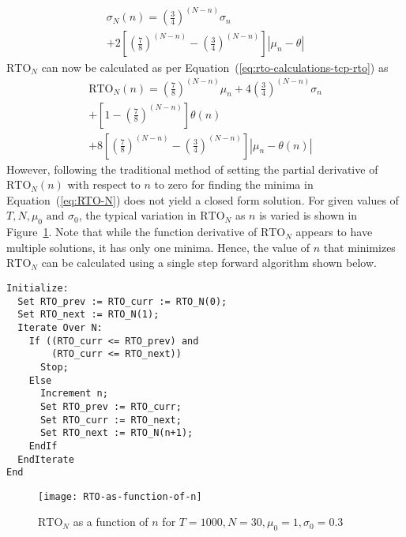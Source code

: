 \documentclass[conference]{IEEEtran}
\begin{document}
\begin{multline}
  \label{eq:sigma-N}
  \sigma_N(n) = \left(\frac{3}{4}\right)^{(N-n)} \sigma_n \\+ 2 \left[\left(\frac{7}{8}\right)^{(N-n)} - \left(\frac{3}{4}\right)^{(N-n)}\right] |\mu_n - \theta|
\end{multline}
$\text{RTO}_N$ can now be calculated as per Equation~(\ref{eq:rto-calculations-tcp-rto}) as
\begin{multline}
  \text{RTO}_N(n) = \left(\frac{7}{8}\right)^{(N-n)} \mu_n + 4\left(\frac{3}{4}\right)^{(N-n)} \sigma_n 
  \\+ \left[1-\left(\frac{7}{8}\right)^{(N-n)}\right] \theta(n)  
  \\+ 8\left[\left(\frac{7}{8}\right)^{(N-n)} - \left(\frac{3}{4}\right)^{(N-n)}\right] |\mu_n-\theta(n)|
  \label{eq:RTO-N}
\end{multline}
However, following the traditional method of setting the partial derivative of $\text{RTO}_N(n)$ with respect to $n$ to zero for finding the minima in Equation~(\ref{eq:RTO-N}) does not yield a closed form solution. For given values of $T, N, \mu_0 \text{ and } \sigma_0$, the typical variation in $\text{RTO}_N$ as $n$ is varied is shown in Figure~\ref{fig:rto-function-n}. Note that while the function derivative of $\text{RTO}_N$ appears to have multiple solutions, it has only one minima. Hence, the value of $n$ that minimizes $\text{RTO}_N$ can be calculated using a single step forward algorithm shown below. 

\begin{verbatim}
Initialize: 
  Set RTO_prev := RTO_curr := RTO_N(0);
  Set RTO_next := RTO_N(1);
  Iterate Over N:
    If ((RTO_curr <= RTO_prev) and 
        (RTO_curr <= RTO_next))
      Stop;
    Else
      Increment n;
      Set RTO_prev := RTO_curr;
      Set RTO_curr := RTO_next;
      Set RTO_next := RTO_N(n+1);
    EndIf
  EndIterate
End
\end{verbatim}

\begin{figure}
  \centering
  \texttt{[image: RTO-as-function-of-n]}
  \caption{$\text{RTO}_N$ as a function of $n$ for $T = 1000, N = 30, \mu_0 = 1, \sigma_0 = 0.3$}
  \label{fig:rto-function-n}
\end{figure}
\end{document}
